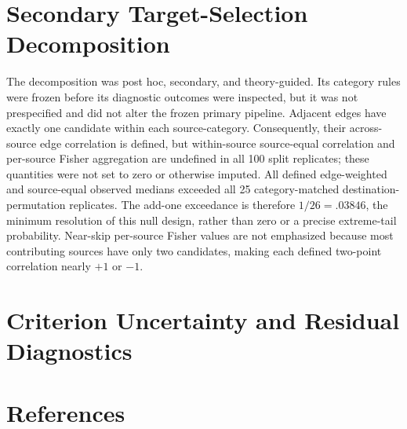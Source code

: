 \documentclass[11pt]{article}
\begin{document}
\section{Secondary Target-Selection Decomposition}

The decomposition was post hoc, secondary, and theory-guided. Its category rules were frozen before its diagnostic outcomes were inspected, but it was not prespecified and did not alter the frozen primary pipeline. Adjacent edges have exactly one candidate within each source-category. Consequently, their across-source edge correlation is defined, but within-source source-equal correlation and per-source Fisher aggregation are undefined in all 100 split replicates; these quantities were not set to zero or otherwise imputed. All defined edge-weighted and source-equal observed medians exceeded all 25 category-matched destination-permutation replicates. The add-one exceedance is therefore $1/26=.03846$, the minimum resolution of this null design, rather than zero or a precise extreme-tail probability. Near-skip per-source Fisher values are not emphasized because most contributing sources have only two candidates, making each defined two-point correlation nearly $+1$ or $-1$.

\section{Criterion Uncertainty and Residual Diagnostics}



\section*{References}

\end{document}
